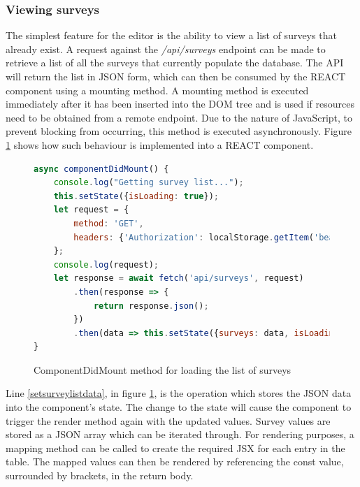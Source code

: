 \subsubsection*{Viewing surveys}

The simplest feature for the editor is the ability to view a list of surveys that already exist.
A request against the \textit{/api/surveys} endpoint can be made to retrieve a list of all the surveys that currently populate
the database.
The API will return the list in JSON form, which can then be consumed by the REACT component using a mounting method.
A mounting method is executed immediately after it has been inserted into the DOM tree and is used if resources need to be obtained
from a remote endpoint.
Due to the nature of JavaScript, to prevent blocking from occurring, this method is executed asynchronously.
Figure \ref{serverlistcomponentmount} shows how such behaviour is implemented into a REACT component. 

\begin{figure}[ht]
    \centering
    \begin{lstlisting}[language=Javascript, escapechar=|]
async componentDidMount() {
    console.log("Getting survey list...");
    this.setState({isLoading: true});
    let request = {
        method: 'GET',
        headers: {'Authorization': localStorage.getItem('bearer')},
    };
    console.log(request);
    let response = await fetch('api/surveys', request)
        .then(response => {
            return response.json();
        })
        .then(data => this.setState({surveys: data, isLoading: false})); |\label{setsurveylistdata}|
}
    \end{lstlisting}
    \caption{ComponentDidMount method for loading the list of surveys}
    \label{serverlistcomponentmount}
\end{figure}

Line \ref{setsurveylistdata}, in figure \ref{serverlistcomponentmount}, is the operation which stores the JSON data into the component's state.
The change to the state will cause the component to trigger the render method again with the updated values.
Survey values are stored as a JSON array which can be iterated through.
For rendering purposes, a mapping method can be called to create the required JSX for each entry in the table.
The mapped values can then be rendered by referencing the const value, surrounded by brackets, in the return body.

